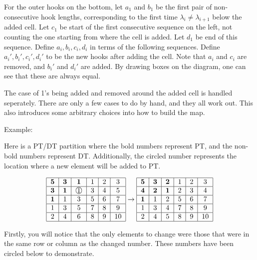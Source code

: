 \documentclass{amsart}
\theoremstyle{definition}
\newcommand{\cir}[1]{\raisebox{.5pt}{\textcircled{\raisebox{-.9pt} {#1}}}}
\begin{document}
For the outer hooks on the bottom, let $a_1$ and $b_1$ be the first
pair of non-consecutive hook lengths, corresponding to the first time
$\lambda_i \neq \lambda_{i+1}$ below the added cell.  Let $c_1$ be
start of the first consecutive sequence on the left, not counting the
one starting from where the cell is added.  Let $d_1$ be end of this
sequence.  Define $a_i, b_i, c_i, d_i$ in terms of the following
sequences.  Define $a_i', b_i', c_i', d_i'$ to be the new hooks after
adding the cell.  Note that $a_i$ and $c_i$ are removed, and $b_i'$
and $d_i'$ are added.  By drawing boxes on the diagram, one can see
that these are always equal.

The case of 1's being added and removed around the added cell is
handled seperately.  There are only a few cases to do by hand, and
they all work out.  This also introduces some arbitrary choices into
how to build the map.

Example:

Here is a PT/DT partition where the bold numbers represent PT, and the non-bold numbers represent DT.  Additionally, the circled number represents the location where a new element will be added to PT.
\begin{figure}[h]
	\[
	\begin{tabular}{|c|c|c|c|c|c|}
		\hline
		$\mathbf{5}$&$\mathbf{3}$&$\mathbf{1}$&1&2&3\\
		\hline
		$\mathbf{3}$&$\mathbf{1}$&$\cir{1}$&3&4&5\\
		\hline
		$\mathbf{1}$&1&3&5&6&7\\
		\hline
		1&3&5&7&8&9\\
		\hline
		2&4&6&8&9&10\\
		\hline
	\end{tabular}
	\rightarrow
	\begin{tabular}{|c|c|c|c|c|c|}
		\hline
		$\mathbf{5}$&$\mathbf{3}$&$\mathbf{2}$&1&2&3\\
		\hline
		$\mathbf{4}$&$\mathbf{2}$&$\mathbf{1}$&2&3&4\\
		\hline
		$\mathbf{1}$&1&2&5&6&7\\
		\hline
		1&3&4&7&8&9\\
		\hline
		2&4&5&8&9&10\\
		\hline
	\end{tabular}
	\]
\end{figure}

Firstly, you will notice that the only elements to change were those that were in the same row or column as the changed number.  These numbers have been circled below to demonstrate.
\end{document}
